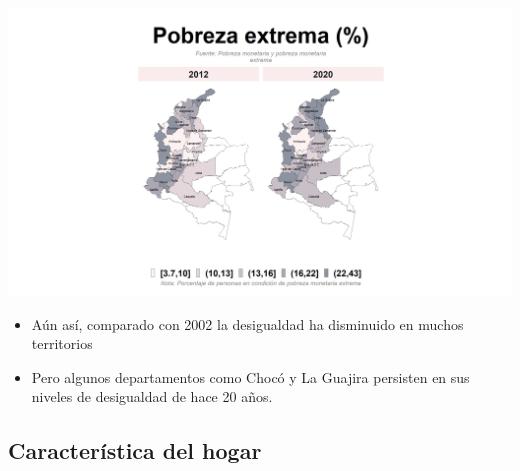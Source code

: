 \documentclass[aspectratio=169]{beamer}
\begin{document}
    \begin{slide}{5} 
                      \begin{imagecolumn}
                \includegraphics[width=\columnwidth]{img/var_288_map.png}
            \end{imagecolumn}
            \begin{textcolumn}
                \begin{itemize}
                    \item Aún así, comparado con 2002 la desigualdad ha disminuido en muchos territorios
                    \item Pero algunos departamentos como Chocó y La Guajira persisten en sus niveles de desigualdad de hace 20 años.
                \end{itemize}
            \end{textcolumn}

    \printcolumns
    \end{slide}
     
    

    
    \subsection{Característica del hogar}
    
\end{document}
